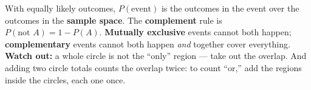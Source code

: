 \documentclass[12pt]{article}
\begin{document}
\vspace{0.14in}

\begin{remindbox}
\small
With equally likely outcomes, $P(\text{event})$ is the outcomes in the event over the outcomes in
the \textbf{sample space}. The \textbf{complement} rule is $P(\text{not } A) = 1 - P(A)$.
\textbf{Mutually exclusive} events cannot both happen; \textbf{complementary} events cannot both
happen \emph{and} together cover everything. \textbf{Watch out:} a whole circle is not the
``only'' region --- take out the overlap. And adding two circle totals counts the overlap twice:
to count ``or,'' add the regions inside the circles, each one once.
\end{remindbox}
\end{document}
